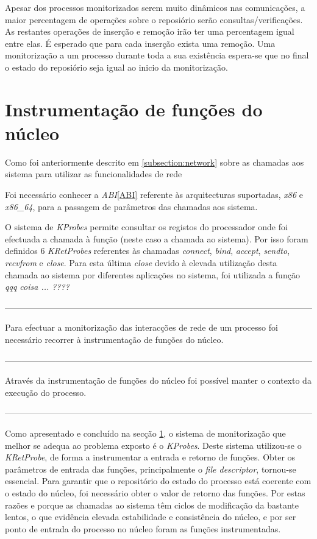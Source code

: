 Apesar dos processos monitorizados serem muito dinâmicos nas comunicações, a maior percentagem de operações sobre o reposiório serão consultas/verificações.
 As restantes operações de inserção e remoção irão ter uma percentagem igual entre elas.
 É esperado que para cada inserção exista uma remoção.
 Uma monitorização a um processo durante toda a sua existência espera-se que no final o estado do reposiório seja igual ao inicio da monitorização.

\section{Instrumentação de funções do núcleo}

Como foi anteriormente descrito em \ref{subsection:network} sobre as chamadas aos sistema para utilizar as funcionalidades de rede

Foi necessário conhecer a \textit{ABI}\ref{ABI}\cite{ABI} referente às arquitecturas suportadas, \textit{x86} e \textit{x86\_64}, para a passagem de parâmetros das chamadas aos sistema.

O sistema de \textit{KProbes} permite consultar os registos do processador onde foi efectuada a chamada à função (neste caso a chamada ao sistema).
 Por isso foram definidos 6 \textit{KRetProbes} referentes às chamadas \textit{connect}, \textit{bind}, \textit{accept}, \textit{sendto}, \textit{recvfrom} e
\textit{close}.
 Para esta última \textit{close} devido à elevada utilização desta chamada ao sistema por diferentes aplicações no sistema, foi utilizada a função \textit{qqq coisa ...  ????}

------------------------------------------------------------------------------------------------------------

Para efectuar a monitorização das interacções de rede de um processo foi necessário recorrer à instrumentação de funções do núcleo.

------------------------------------------------------------------------------------------------------------

Através da instrumentação de funções do núcleo foi possível manter o contexto da execução do processo.

------------------------------------------------------------------------------------------------------------

Como apresentado e concluído na secção \ref{}, o sistema de monitorização que melhor se adequa ao problema exposto é o \textit{KProbes}.
 Deste sistema utilizou-se o \textit{KRetProbe}, de forma a instrumentar a entrada e retorno de funções.
 Obter os parâmetros de entrada das funções, principalmente o \textit{file descriptor}, tornou-se essencial.
 Para garantir que o repositório do estado do processo está coerente com o estado do núcleo, foi necessário obter o valor de retorno das funções.
 Por estas razões e porque as chamadas ao sistema têm ciclos de modificação da bastante lentos, o que evidência elevada estabilidade e consistência do núcleo, e por ser ponto de entrada do processo no núcleo foram as funções instrumentadas.

